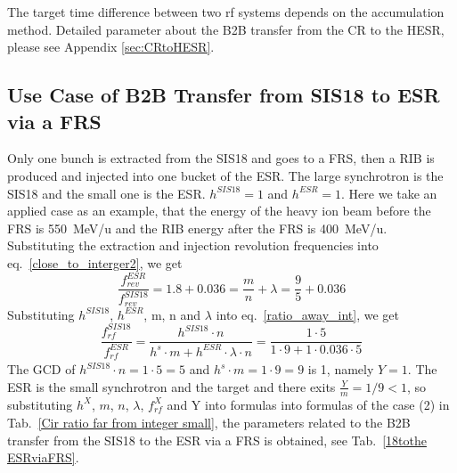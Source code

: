 The target time difference between two rf systems depends on the accumulation method. Detailed parameter about the B2B transfer from the CR to the HESR, please see Appendix \ref{sec:CRtoHESR}. 
\subsection{Use Case of B2B Transfer from SIS18 to ESR via a FRS} 
Only one bunch is extracted from the SIS18 and goes to a FRS, then a RIB is produced and injected into one bucket of the ESR. The large synchrotron is the SIS18 and the small one is the ESR. $h^{\mathit{SIS18}}=1$ and $h^{\mathit{ESR}}=1$. Here we take an applied case as an example, that the energy of the heavy ion beam before the FRS is \SI{550}{MeV/\atomicmassunit} and the RIB energy after the FRS is \SI{400}{MeV/\atomicmassunit}. Substituting the extraction and injection revolution frequencies into eq.~\ref{close_to_interger2}, we get
\begin{equation} 
\frac{f_{\mathit{rev}}^{\mathit{ESR}}}{f_{\mathit{rev}}^{\mathit{SIS18}}}=1.8+0.036=\frac{m}{n}+ \lambda=\frac{9}{5}+0.036
\end{equation}
Substituting $h^{\mathit{SIS18}}$, $h^{\mathit{ESR}}$, m, n and $\lambda$ into eq.~\ref{ratio_away_int}, we get
\begin{equation}
\frac{f_{\mathit{rf}}^{\mathit{SIS18}}}{f_{\mathit{rf}}^{\mathit{ESR}}}=\frac{h^{\mathit{SIS18}}\cdot n}{h^s \cdot m+ h^{\mathit{ESR}} \cdot\lambda\cdot n}=\frac{1\cdot 5}{1 \cdot 9+1 \cdot0.036\cdot 5}
\end{equation}
The GCD of $h^{\mathit{SIS18}}\cdot n=1\cdot5=5$ and $h^s \cdot m=1\cdot 9=9$ is 1, namely $Y=1$. The ESR is the small synchrotron and the target and there exits $\frac{Y}{m}=1/9<1$, so substituting $h^X$, $m$, $n$, $\lambda$, $f_{\mathit{rf}}^{X}$ and Y into formulas into formulas of the case (2) in Tab.~\ref{Cir ratio far from integer small}, the parameters related to the B2B transfer from the SIS18 to the ESR via a FRS is obtained, see Tab.~\ref{18tothe ESRviaFRS}.
